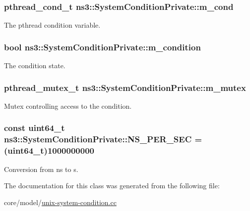 \subsubsection[{\texorpdfstring{m\+\_\+cond}{m_cond}}]{\setlength{\rightskip}{0pt plus 5cm}pthread\+\_\+cond\+\_\+t ns3\+::\+System\+Condition\+Private\+::m\+\_\+cond\hspace{0.3cm}{\ttfamily [private]}}\hypertarget{classns3_1_1SystemConditionPrivate_a812da27a9c28ef6191f6defa019a02d4}{}\label{classns3_1_1SystemConditionPrivate_a812da27a9c28ef6191f6defa019a02d4}
The pthread condition variable. 
\subsubsection[{\texorpdfstring{m\+\_\+condition}{m_condition}}]{\setlength{\rightskip}{0pt plus 5cm}bool ns3\+::\+System\+Condition\+Private\+::m\+\_\+condition\hspace{0.3cm}{\ttfamily [private]}}\hypertarget{classns3_1_1SystemConditionPrivate_abab2c2936fff504312d0c30f0ca1e145}{}\label{classns3_1_1SystemConditionPrivate_abab2c2936fff504312d0c30f0ca1e145}
The condition state. 
\subsubsection[{\texorpdfstring{m\+\_\+mutex}{m_mutex}}]{\setlength{\rightskip}{0pt plus 5cm}pthread\+\_\+mutex\+\_\+t ns3\+::\+System\+Condition\+Private\+::m\+\_\+mutex\hspace{0.3cm}{\ttfamily [private]}}\hypertarget{classns3_1_1SystemConditionPrivate_abb57bb9b2d0d6459ea861ff1eef5959e}{}\label{classns3_1_1SystemConditionPrivate_abb57bb9b2d0d6459ea861ff1eef5959e}
Mutex controlling access to the condition. 
\subsubsection[{\texorpdfstring{N\+S\+\_\+\+P\+E\+R\+\_\+\+S\+EC}{NS_PER_SEC}}]{\setlength{\rightskip}{0pt plus 5cm}const uint64\+\_\+t ns3\+::\+System\+Condition\+Private\+::\+N\+S\+\_\+\+P\+E\+R\+\_\+\+S\+EC = (uint64\+\_\+t)1000000000\hspace{0.3cm}{\ttfamily [static]}}\hypertarget{classns3_1_1SystemConditionPrivate_a677a08c18d846d886ad1b3b251d48d9b}{}\label{classns3_1_1SystemConditionPrivate_a677a08c18d846d886ad1b3b251d48d9b}


Conversion from ns to s. 



The documentation for this class was generated from the following file\+:\begin{DoxyCompactItemize}
\item 
core/model/\hyperlink{unix-system-condition_8cc}{unix-\/system-\/condition.\+cc}\end{DoxyCompactItemize}
